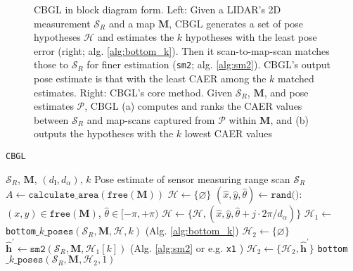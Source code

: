 \begin{figure}\vspace{-0.4cm}
  \hspace{-0.5cm}
  \subfloat{\label{fig:cbgl}     }
  \hspace{-0.99cm}
  \subfloat{\label{fig:bottom_k} }
  \caption{\small CBGL in block diagram form. Left: Given a LIDAR's 2D
           measurement $\mathcal{S}_R$ and a map $\bm{M}$, CBGL generates a set
           of pose hypotheses $\mathcal{H}$ and estimates the $k$ hypotheses
           with the least pose error (right; alg. \ref{alg:bottom_k}). Then it
           scan-to-map-scan matches those to $\mathcal{S}_R$ for finer
           estimation (\texttt{sm2}; alg. \ref{alg:sm2}). CBGL's output pose
           estimate is that with the least CAER among the $k$ matched
           estimates.  Right: CBGL's core method. Given $\mathcal{S}_R$,
           $\bm{M}$, and pose estimates $\mathcal{P}$, CBGL (a) computes and
           ranks the CAER values between $\mathcal{S}_R$ and map-scans captured
           from $\mathcal{P}$ within $\bm{M}$, and (b) outputs the hypotheses
           with the $k$ lowest CAER values}
\end{figure}


\begin{algorithm}[]
  \caption{\texttt{CBGL}}
  \begin{spacing}{1.0}
  \begin{algorithmic}[1]
    \REQUIRE $\mathcal{S}_R$, $\bm{M}$, $(d_{\bm{l}}, d_\alpha)$, $k$
    \ENSURE Pose estimate of sensor measuring range scan $\mathcal{S}_R$ %
    \STATE $A \leftarrow \texttt{calculate\_area}(\texttt{free}(\bm{M}))$
    \STATE $\mathcal{H} \leftarrow \{\varnothing\}$
      \STATE \small $(\hat{x},\hat{y},\hat{\theta}) \leftarrow \texttt{rand()}$: $(x,y) \in \texttt{free}(\bm{M})$, $\hat{\theta} \in [-\pi,+\pi)$
        \STATE $\mathcal{H} \leftarrow \{\mathcal{H}, (\hat{x}, \hat{y}, \hat{\theta} + j \cdot 2\pi / d_{\alpha})\}$     \label{alg:cbgl:h}
      \ENDFOR
    \ENDFOR
    \STATE $\mathcal{H}_1 \leftarrow$ \texttt{bottom}$\_k\_\texttt{poses}(\mathcal{S}_R, \bm{M}, \mathcal{H}, k)$ \hfill {\small (Alg. \ref{alg:bottom_k}}) \label{alg:cbgl:h1}
    \STATE $\mathcal{H}_2 \leftarrow \{\varnothing \}$
      \STATE $\hat{\bm{h}}^\prime \leftarrow \texttt{sm2}(\mathcal{S}_R, \bm{M}, \mathcal{H}_1[k])$ \hfill {\small (Alg. \ref{alg:sm2} or e.g. \texttt{x1} \cite{Filotheou2023a}})
      \STATE $\mathcal{H}_2 \leftarrow \{\mathcal{H}_2, \hat{\bm{h}}^\prime\}$  \label{alg:cbgl:h2}
    \ENDFOR
    \RETURN \texttt{bottom}$\_k\_\texttt{poses}(\mathcal{S}_R, \bm{M}, \mathcal{H}_2, 1)$
  \end{algorithmic}
  \end{spacing}
  \label{alg:cbgl}
\end{algorithm}

